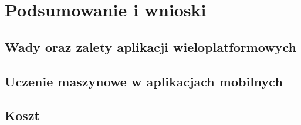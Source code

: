 \documentclass[brudnopis]{xmgr}
\begin{document}
\chapter{Podsumowanie i wnioski}

\section{Wady oraz zalety aplikacji wieloplatformowych}

\section{Uczenie maszynowe w aplikacjach mobilnych}

\section{Koszt}

\summary




\oswiadczenie
\end{document}
